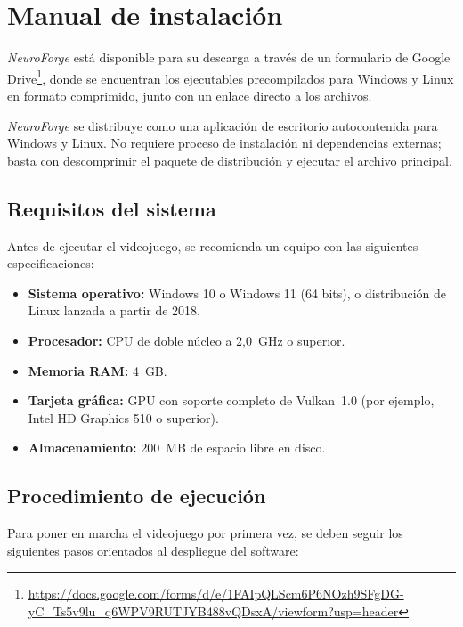 \chapter{Manual de instalación}

\textit{NeuroForge} está disponible para su descarga a través de un formulario de Google Drive\footnote{\url{https://docs.google.com/forms/d/e/1FAIpQLScm6P6NOzh9SFgDG-yC_Ts5v9lu_q6WPV9RUTJYB488vQDsxA/viewform?usp=header}}, donde se encuentran los ejecutables precompilados para Windows y Linux en formato comprimido, junto con un enlace directo a los archivos.

\textit{NeuroForge} se distribuye como una aplicación de escritorio autocontenida para Windows y Linux. No requiere proceso de instalación ni dependencias externas; basta con descomprimir el paquete de distribución y ejecutar el archivo principal.

\section{Requisitos del sistema}
Antes de ejecutar el videojuego, se recomienda un equipo con las siguientes especificaciones:
\begin{itemize}
	\item \textbf{Sistema operativo:} Windows 10 o Windows 11 (64 bits), o distribución de Linux lanzada a partir de 2018.
	\item \textbf{Procesador:} CPU de doble núcleo a 2,0~GHz o superior.
	\item \textbf{Memoria RAM:} 4~GB.
	\item \textbf{Tarjeta gráfica:} GPU con soporte completo de Vulkan~1.0 (por ejemplo, Intel HD Graphics 510 o superior).
	\item \textbf{Almacenamiento:} 200~MB de espacio libre en disco.
\end{itemize}

\clearpage

\section{Procedimiento de ejecución}

Para poner en marcha el videojuego por primera vez, se deben seguir los siguientes pasos orientados al despliegue del software:

